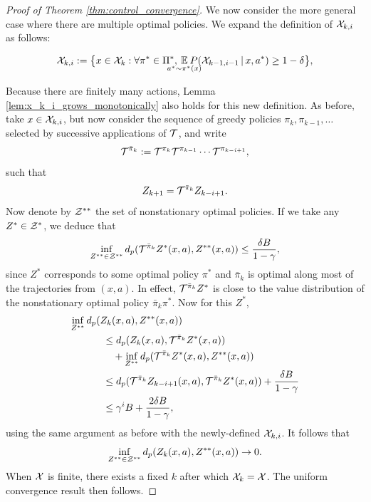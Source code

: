 \documentclass{article}
\def \cXk {\cX_k}
\begin{document}
\begin{proof}[Proof of Theorem \ref{thm:control_convergence}]
We now consider the more general case where there are multiple optimal policies. We expand the definition of $\mathcal{X}_{k,i}$ as follows:
\begin{small}
\begin{equation*}
\cX_{k,i} := \big \{ x \in \cXk :\forall \pi^* \in \Pi^*, \; \;\mathclap{\expect_{a^* \sim \pi^*(x)}} \; \; P(\cX_{k-1,i-1} \cbar x, a^*) \ge 1 - \delta  \big \},
\end{equation*}
\end{small}
Because there are finitely many actions, Lemma \ref{lem:x_k_i_grows_monotonically} also holds for this new definition. As before, take $x \in \mathcal{X}_{k,i}$, but now consider the sequence of greedy policies $\pi_{k}, \pi_{k-1}, \dots$ selected by successive applications of $\mathcal{T}$, and write
\begin{equation*}
\mathcal{T}^{\bar \pi_k} := \mathcal{T}^{\pi_k} \mathcal{T}^{\pi_{k-1}} \cdots \mathcal{T}^{\pi_{k-i+1}},
\end{equation*}
such that
\begin{equation*}
Z_{k+1} = \mathcal{T}^{\bar \pi_k} Z_{k-i+1} .
\end{equation*}
Now denote by $\mathcal{Z}^{**}$ the set of nonstationary optimal policies. If we take any $Z^* \in \mathcal{Z}^*$, we deduce that
\begin{equation*}
\inf_{Z^{**} \in \mathcal{Z}^{**}} d_p(\mathcal{T}^{\bar \pi_k} Z^*(x,a), Z^{**}(x,a)) \le \frac{\delta B}{1 - \gamma},
\end{equation*}
since $Z^*$ corresponds to some optimal policy $\pi^*$ and $\bar \pi_k$ is optimal along most of the trajectories from $(x,a)$. In effect, $\mathcal{T}^{\bar \pi_k} Z^*$ is close to the value distribution of the nonstationary optimal policy $\bar \pi_k \pi^*$. Now for this $Z^*$,
\begin{align*}
\inf_{Z^{**}} d_p(Z_k(x,a), Z^{**}(x,a)) &\\
&\hspace{-8em}\le d_p(Z_k(x,a), \cT^{\bar \pi_k} Z^{*}(x,a)) \\
&\hspace{-7em}+ \inf_{Z^{**}} d_p(\cT^{\bar \pi_k} Z^*(x,a), Z^{**}(x,a)) \\
&\hspace{-8em}\le d_p(\cT^{\bar \pi_k} Z_{k-i+1}(x,a), \cT^{\bar \pi_k} Z^{*}(x,a)) + \frac{\delta B}{1 - \gamma} \\
&\hspace{-8em}\le \gamma^i B + \frac{2 \delta B}{1-\gamma},
\end{align*}
using the same argument as before with the newly-defined $\mathcal{X}_{k,i}$.
It follows that
\begin{equation*}
\inf_{Z^{**} \in \mathcal{Z}^{**}} d_p(Z_k(x,a), Z^{**}(x,a)) \to 0.
\end{equation*}
When $\mathcal{X}$ is finite, there exists a fixed $k$ after which $\mathcal{X}_k = \mathcal{X}$. The uniform convergence result then follows.


\end{proof}
\end{document}
